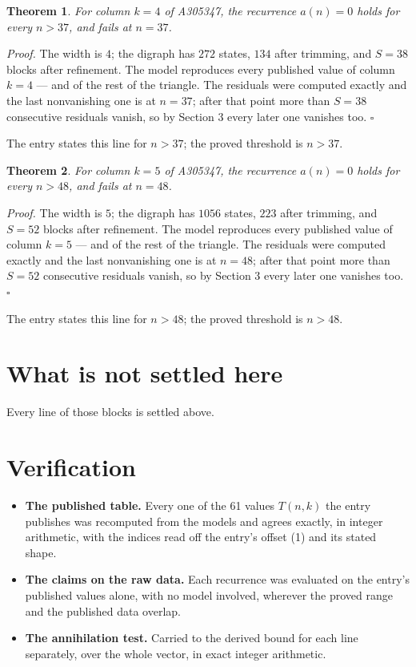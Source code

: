 \documentclass[11pt]{article}
\newtheorem{theorem}{Theorem}
\theoremstyle{definition}
\begin{document}
\begin{theorem} For column $k = 4$ of A305347, the recurrence $a(n) = 0$ holds for every $n > 37$, and fails at $n = 37$.\end{theorem}

{\itshape Proof.} The width is $4$; the digraph has $272$ states, $134$ after trimming, and $S = 38$ blocks after refinement. The model reproduces every published value of column $k = 4$ --- and of the rest of the triangle. The residuals were computed exactly and the last nonvanishing one is at $n = 37$; after that point more than $S = 38$ consecutive residuals vanish, so by Section 3 every later one vanishes too. $\square$

The entry states this line for $n > 37$; the proved threshold is $n > 37$.

\begin{theorem} For column $k = 5$ of A305347, the recurrence $a(n) = 0$ holds for every $n > 48$, and fails at $n = 48$.\end{theorem}

{\itshape Proof.} The width is $5$; the digraph has $1056$ states, $223$ after trimming, and $S = 52$ blocks after refinement. The model reproduces every published value of column $k = 5$ --- and of the rest of the triangle. The residuals were computed exactly and the last nonvanishing one is at $n = 48$; after that point more than $S = 52$ consecutive residuals vanish, so by Section 3 every later one vanishes too. $\square$

The entry states this line for $n > 48$; the proved threshold is $n > 48$.

\section{What is not settled here}

Every line of those blocks is settled above.

\section{Verification}

\begin{itemize}

\item {\bfseries The published table.} Every one of the 61 values $T(n,k)$ the entry publishes was recomputed from the models and agrees exactly, in integer arithmetic, with the indices read off the entry's offset (1) and its stated shape.

\item {\bfseries The claims on the raw data.} Each recurrence was evaluated on the entry's published values alone, with no model involved, wherever the proved range and the published data overlap.

\item {\bfseries The annihilation test.} Carried to the derived bound for each line separately, over the whole vector, in exact integer arithmetic.

\end{itemize}
\end{document}
